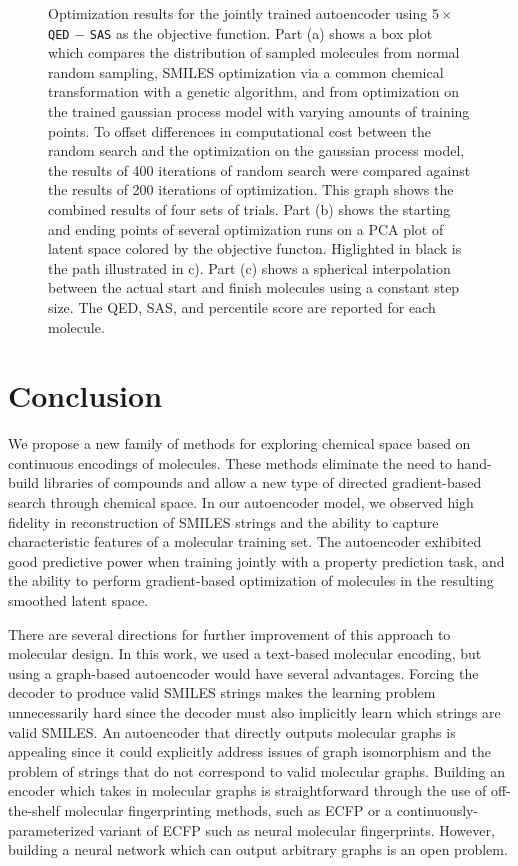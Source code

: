 \begin{figure}
\begin{subfigure}{\textwidth}
    \end{subfigure}
	\caption[Optimization Results in Latent Space]{ Optimization results for the jointly trained autoencoder using $5 \times$ \texttt{QED} $-$ \texttt{SAS} as the objective function. Part (a) shows a box plot which compares the distribution of sampled molecules from normal random sampling, SMILES optimization via a common chemical transformation with a genetic algorithm, and from optimization on the trained gaussian process model with varying amounts of training points. To offset differences in computational cost between the random search and the optimization on the gaussian process model, the results of 400 iterations of random search were compared against the results of 200 iterations of optimization. This graph shows the combined results of four sets of trials. Part (b) shows the starting and ending points of several optimization runs on a PCA plot of latent space colored by the objective functon. Higlighted in black is the path illustrated in c). Part (c) shows a spherical interpolation between the actual start and finish molecules using a constant step size. The QED, SAS, and percentile score are reported for each molecule.}
    \label{fig:optimize_mols}
\end{figure}


\section{Conclusion}
We propose a new family of methods for exploring chemical space based on continuous encodings of molecules.
These methods eliminate the need to hand-build libraries of compounds and allow a new type of directed gradient-based search through chemical space. In our autoencoder model, we observed high fidelity in reconstruction of SMILES strings and the ability to capture characteristic features of a molecular training set. The autoencoder exhibited good predictive power when training jointly with a property prediction task, and the ability to perform gradient-based optimization of molecules in the resulting smoothed latent space.

There are several directions for further improvement of this approach to molecular design.
In this work, we used a text-based molecular encoding, but using a graph-based autoencoder would have several advantages.
Forcing the decoder to produce valid SMILES strings makes the learning problem unnecessarily hard since the decoder must also implicitly learn which strings are valid SMILES.
An autoencoder that directly outputs molecular graphs is appealing since it could explicitly address issues of graph isomorphism and the problem of strings that do not correspond to valid molecular graphs. Building an encoder which takes in molecular graphs is straightforward through the use of off-the-shelf molecular fingerprinting methods, such as ECFP\cite{ECFP2010} or a continuously-parameterized variant of ECFP such as neural molecular fingerprints.\cite{duvenaud2015convolutional}
However, building a neural network which can output arbitrary graphs is an open problem.

